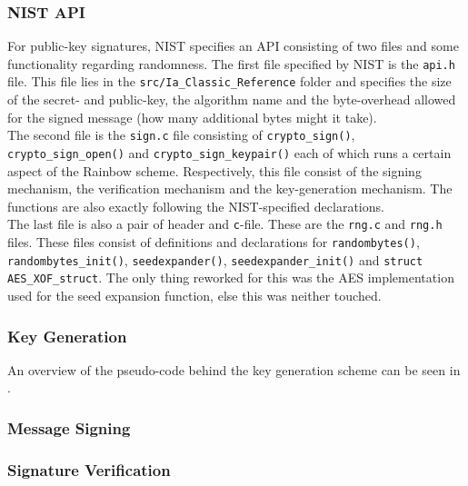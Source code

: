 \subsubsection{NIST API}
For public-key signatures, NIST specifies an API consisting of two files and some functionality regarding randomness. The first file specified by NIST is the \texttt{api.h} file. This file lies in the \texttt{src/Ia\_Classic\_Reference} folder and specifies the size of the secret- and public-key, the algorithm name and the byte-overhead allowed for the signed message (how many additional bytes might it take).
\medskip\\
The second file is the \texttt{sign.c} file consisting of \texttt{crypto\_sign()}, \texttt{crypto\_sign\_open()} and \texttt{crypto\_sign\_keypair()} each of which runs a certain aspect of the Rainbow scheme. Respectively, this file consist of the signing mechanism, the verification mechanism and the key-generation mechanism. The functions are also exactly following the NIST-specified declarations.
\medskip\\
The last file is also a pair of header and \texttt{c}-file. These are the \texttt{rng.c} and \texttt{rng.h} files. These files consist of definitions and declarations for \texttt{randombytes()}, \texttt{randombytes\_init()}, \texttt{seedexpander()}, \texttt{seedexpander\_init()} and \texttt{struct AES\_XOF\_struct}. The only thing reworked for this was the AES implementation used for the seed expansion function, else this was neither touched.
\subsubsection{Key Generation}
An overview of the pseudo-code behind the key generation scheme can be seen in \cite{nistapi}. 
\subsubsection{Message Signing}

\subsubsection{Signature Verification}
